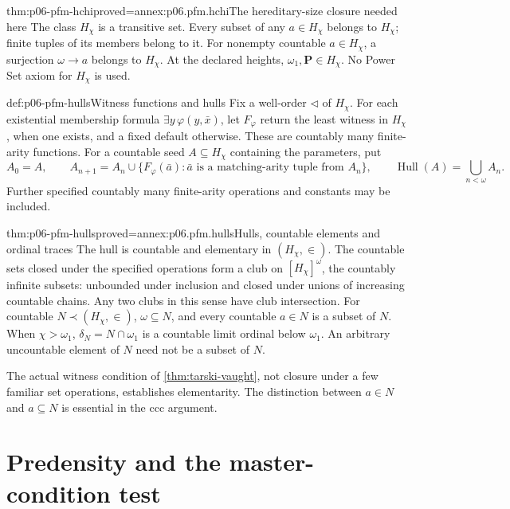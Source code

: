 \begin{hblemma}{thm:p06-pfm-hchi}{proved=annex:p06.pfm.hchi}{The hereditary-size closure needed here}
The class \(H_\chi\) is a transitive set. Every subset of any \(a\in H_\chi\)
belongs to \(H_\chi\); finite tuples of its members belong to it.
For nonempty countable \(a\in H_\chi\), a surjection \(\omega\to a\)
belongs to \(H_\chi\). At the declared heights, \(\omega_1,\mathbf P\in
H_\chi\). No Power Set axiom for \(H_\chi\) is used.
\end{hblemma}

\begin{hbdefinition}{def:p06-pfm-hulls}{Witness functions and hulls}
Fix a well-order \(\triangleleft\) of \(H_\chi\). For each existential
membership formula \(\exists y\,\varphi(y,\bar x)\), let \(F_\varphi\)
return the least witness in \(H_\chi\), when one exists, and a fixed default
otherwise. These are countably many finite-arity functions.
For a countable seed \(A\subseteq H_\chi\) containing the parameters, put
\[
 A_0=A,\qquad A_{n+1}=A_n\cup
 \{F_\varphi(\bar a):\bar a\text{ is a matching-arity tuple from }A_n\},
 \qquad \operatorname{Hull}(A)=\bigcup_{n<\omega}A_n .
\]
Further specified countably many finite-arity operations and constants
may be included.
\end{hbdefinition}

\begin{hbtheorem}{thm:p06-pfm-hulls}{proved=annex:p06.pfm.hulls}{Hulls, countable elements and ordinal traces}
The hull is countable and elementary in \((H_\chi,\in)\).
The countable sets closed under the specified operations form a club on
\([H_\chi]^\omega\), the countably infinite subsets: unbounded under inclusion and closed under unions
of increasing countable chains. Any two clubs in this sense have club
intersection.
For countable \(N\prec(H_\chi,\in)\), \(\omega\subseteq N\), and every countable
\(a\in N\) is a subset of \(N\). When \(\chi>\omega_1\),
\(\delta_N=N\cap\omega_1\) is a countable limit ordinal below \(\omega_1\).
An arbitrary uncountable element of \(N\) need not be a subset of \(N\).
\end{hbtheorem}

The actual witness condition of \cref{thm:tarski-vaught}, not closure under
a few familiar set operations, establishes elementarity. The distinction
between \(a\in N\) and \(a\subseteq N\) is essential in the ccc argument.

\section{Predensity and the master-condition test}
\label{sec:p06-pfm-master}

